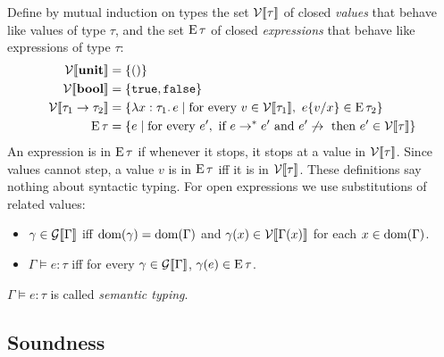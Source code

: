 Define by mutual induction on types the set $\mathcal{V}[\![\tau]\!]$ of closed \emph{values} that
behave like values of type $\tau$, and the set $\operatorname{E}{\tau}$ of closed \emph{expressions}
that behave like expressions of type $\tau$:
\begin{align*}
\V{\kw{unit}} &= \{()\} \\
\V{\kw{bool}} &= \{\ttkw{true}, \ttkw{false}\} \\
\V{\tau_1 \to \tau_2} &= \{\lambda x : \tau_1.\, e \mid \text{for every } v \in \V{\tau_1},\ \tsub{e}{v}{x} \in \E{\tau_2}\} \\
\E{\tau} &= \{e \mid \text{for every } e',\ \text{if } e \to^* e' \text{ and } e' \nstep \text{ then } e' \in \V{\tau}\}
\end{align*}
An expression is in $\operatorname{E}{\tau}$ if whenever it stops, it stops at a value in $\mathcal{V}[\![\tau]\!]$.
Since values cannot step, a value $v$ is in $\operatorname{E}{\tau}$ iff it is in $\mathcal{V}[\![\tau]\!]$. These
definitions say nothing about syntactic typing. For open expressions we use
substitutions of related values:
\begin{itemize}
  \item $\gamma \in \mathcal{G}[\![\Gamma]\!]$ iff $\operatorname{dom}(\gamma) = \operatorname{dom}(\Gamma)$ and
        $\gamma(x) \in \mathcal{V}[\![\Gamma(x)]\!]$ for each $x \in \operatorname{dom}(\Gamma)$.
  \item $\Gamma \vDash e : \tau$ iff for every $\gamma \in \mathcal{G}[\![\Gamma]\!]$,
        $\gamma(e) \in \operatorname{E}{\tau}$.
\end{itemize}
$\Gamma \vDash e : \tau$ is called \emph{semantic typing}.
 
\subsection{Soundness}
 
 
 
 
